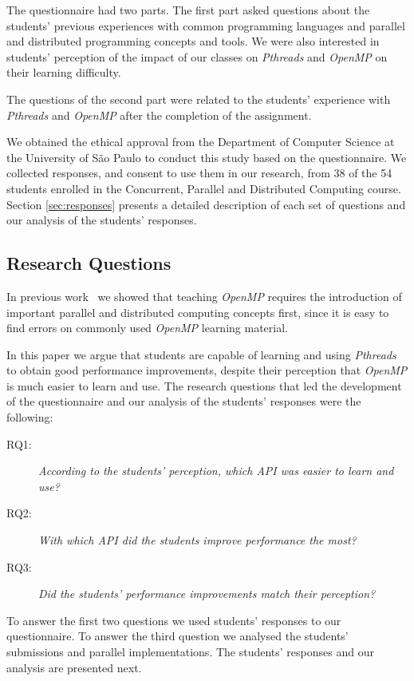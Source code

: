 The questionnaire had two parts. The first part asked questions
about the students' previous experiences with common programming languages and
parallel and distributed programming concepts and tools. We were also
interested in students' perception of the impact of our classes on
\textit{Pthreads} and \textit{OpenMP} on their learning difficulty.

The questions of the second part were related to the students'
experience with \textit{Pthreads} and \textit{OpenMP} after
the completion of the assignment.

We obtained the ethical approval from the Department of Computer Science at the
University of São Paulo to conduct this study based on the questionnaire. We
collected responses, and consent to use them in our research, from 38 of the 54
students enrolled in the Concurrent, Parallel and Distributed Computing course.
Section \ref{sec:responses} presents a detailed description of each set of
questions and our analysis of the students' responses.

\subsection{Research Questions}
\label{sec:resques}

In previous work~\cite{goncalves:OpenMPNotEasy} we showed that teaching
\textit{OpenMP} requires the introduction of important parallel and distributed
computing concepts first, since it is easy to find errors on commonly used
\textit{OpenMP} learning material.

In this paper we argue that students are capable of learning and using
\textit{Pthreads} to obtain good performance improvements, despite their
perception that \textit{OpenMP} is much easier to learn and use.
The research questions that led the development of the questionnaire
and our analysis of the students' responses were the following:

\begin{description}
    \item[RQ1:] \textit{According to the students' perception, which API was
        easier to learn and use?}
    \item[RQ2:] \textit{With which API did the students improve performance the
        most?}
    \item[RQ3:] \textit{Did the students' performance improvements match their
        perception?}
\end{description}

To answer the first two questions we used students' responses to
our questionnaire. To answer the third question we analysed the
students' submissions and parallel implementations. The
students' responses and our analysis are presented next.
